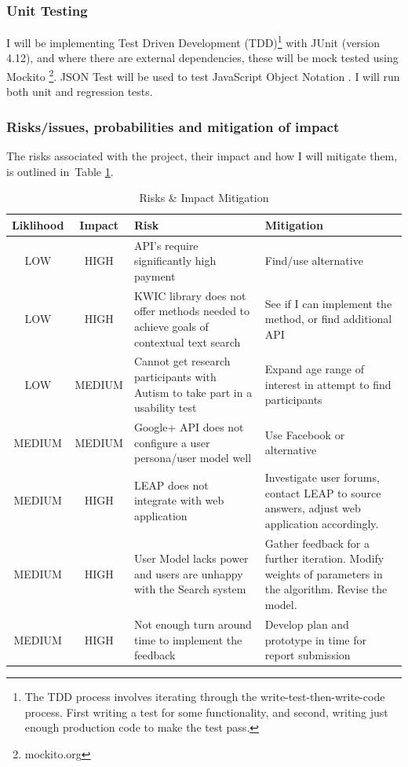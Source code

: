 \documentclass[a4paper, 11pt]{article}
\begin{document}
\subsubsection{Unit Testing}
I will be implementing Test Driven Development (TDD)\footnote{The TDD process involves iterating through the write-test-then-write-code process. First writing a test for some functionality, and second, writing just enough production code to make the test pass.} with JUnit (version 4.12), and where there are external dependencies, these will be mock tested using Mockito \footnote{mockito.org}. JSON Test will be used to test JavaScript Object Notation \cite{jsontest}. I will run both unit and regression tests.

\subsubsection{Risks/issues, probabilities and mitigation of impact}
The risks associated with the project, their impact and how I will mitigate them, is outlined in~Table \ref{risks}. 
\begin{table}[h]
\caption{Risks \& Impact Mitigation} 
\centering
\begin{tabular}{|c | c | p{5cm} | p{5cm} |}
\hline\hline 
Liklihood & Impact & Risk & Mitigation\\ [0.5ex]
\hline 
LOW & HIGH & API's require significantly high payment & Find/use alternative\\
\hline 
LOW & HIGH & KWIC library does not offer methods needed to achieve goals of contextual text search & See if I can implement the method, or find additional API\\
\hline 
LOW & MEDIUM & Cannot get research participants with Autism to take part in a usability test & Expand age range of interest in attempt to find participants\\ 
\hline 
MEDIUM & MEDIUM & Google+ API does not configure a user persona/user model well & Use Facebook or alternative\\
\hline 
MEDIUM & HIGH & LEAP does not integrate with web application & Investigate user forums, contact LEAP to source answers, adjust web application accordingly.\\
\hline
MEDIUM & HIGH & User Model lacks power and users are unhappy with the Search system & Gather feedback for a further iteration. Modify weights of parameters in the algorithm. Revise the model. \\
\hline
MEDIUM & HIGH & Not enough turn around time to implement the feedback & Develop plan and prototype in time for report submission\\[1ex]
\hline
\end{tabular}
\label{risks} 
\end{table}
\end{document}
